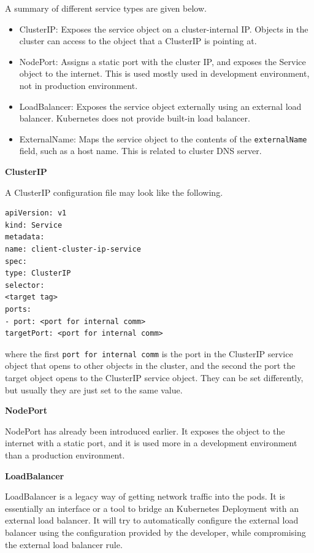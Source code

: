 A summary of different service types are given below.
\begin{itemize}
	\item ClusterIP: Exposes the service object on a cluster-internal IP. Objects in the cluster can access to the object that a ClusterIP is pointing at.
	\item NodePort: Assigns a static port with the cluster IP, and exposes the Service object to the internet. This is used mostly used in development environment, not in production environment.
	\item LoadBalancer: Exposes the service object externally using an external load balancer. Kubernetes does not provide built-in load balancer.
	\item ExternalName: Maps the service object to the contents of the \verb|externalName| field, such as a host name. This is related to cluster DNS server.
\end{itemize}

\vspace{0.1in}
\noindent \textbf{ClusterIP}
\vspace{0.1in}

A ClusterIP configuration file may look like the following.
\begin{lstlisting}
apiVersion: v1
kind: Service
metadata:
name: client-cluster-ip-service
spec:
type: ClusterIP
selector:
<target tag>
ports:
- port: <port for internal comm>
targetPort: <port for internal comm>
\end{lstlisting}
where the first \verb|port for internal comm| is the port in the ClusterIP service object that opens to other objects in the cluster, and the second the port the target object opens to the ClusterIP service object. They can be set differently, but usually they are just set to the same value.

\vspace{0.1in}
\noindent \textbf{NodePort}
\vspace{0.1in}

NodePort has already been introduced earlier. It exposes the object to the internet with a static port, and it is used more in a development environment than a production environment.

\vspace{0.1in}
\noindent \textbf{LoadBalancer}
\vspace{0.1in}

LoadBalancer is a legacy way of getting network traffic into the pods. It is essentially an interface or a tool to bridge an Kubernetes Deployment with an external load balancer. It will try to automatically configure the external load balancer using the configuration provided by the developer, while compromising the external load balancer rule.

